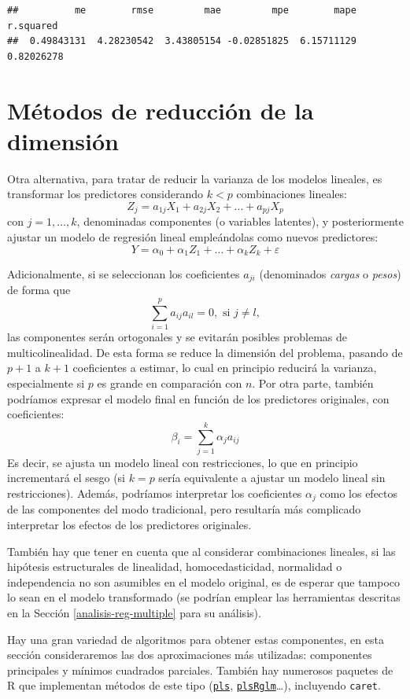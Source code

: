 \documentclass[
]{book}
\theoremstyle{break}
\theoremstyle{definition}
\theoremstyle{definition}
\theoremstyle{definition}
\theoremstyle{remark}
\begin{document}
\begin{verbatim}
##          me        rmse         mae         mpe        mape   r.squared 
##  0.49843131  4.28230542  3.43805154 -0.02851825  6.15711129  0.82026278
\end{verbatim}

\hypertarget{pca-pls}{%
\section{Métodos de reducción de la dimensión}\label{pca-pls}}

Otra alternativa, para tratar de reducir la varianza de los modelos lineales, es transformar los predictores considerando \(k < p\) combinaciones lineales:
\[Z_j = a_{1j}X_{1} + a_{2j}X_{2} + \ldots + a_{pj}X_{p}\]
con \(j = 1, \ldots, k\), denominadas componentes (o variables latentes),
y posteriormente ajustar un modelo de regresión lineal empleándolas como nuevos predictores:
\[Y = \alpha_0 + \alpha_1 Z_1 + \ldots + \alpha_k Z_k + \varepsilon\]

Adicionalmente, si se seleccionan los coeficientes \(a_{ji}\) (denominados \emph{cargas} o \emph{pesos}) de forma que
\[\sum_{i=1}^p a_{ij}a_{il} = 0, \text{ si } j \neq l,\]
las componentes serán ortogonales y se evitarán posibles problemas de multicolinealidad.
De esta forma se reduce la dimensión del problema, pasando de \(p + 1\) a \(k + 1\) coeficientes a estimar, lo cual en principio reducirá la varianza, especialmente si \(p\) es grande en comparación con \(n\).
Por otra parte, también podríamos expresar el modelo final en función de los predictores originales, con coeficientes:
\[\beta_i = \sum_{j=1}^k \alpha_j a_{ij}\]
Es decir, se ajusta un modelo lineal con restricciones, lo que en principio incrementará el sesgo (si \(k = p\) sería equivalente a ajustar un modelo lineal sin restricciones).
Además, podríamos interpretar los coeficientes \(\alpha_j\) como los efectos de las componentes del modo tradicional, pero resultaría más complicado interpretar los efectos de los predictores originales.

También hay que tener en cuenta que al considerar combinaciones lineales, si las hipótesis estructurales de linealidad, homocedasticidad, normalidad o independencia no son asumibles en el modelo original, es de esperar que tampoco lo sean en el modelo transformado (se podrían emplear las herramientas descritas en la Sección \ref{analisis-reg-multiple} para su análisis).

Hay una gran variedad de algoritmos para obtener estas componentes, en esta sección consideraremos las dos aproximaciones más utilizadas: componentes principales y mínimos cuadrados parciales.
También hay numerosos paquetes de R que implementan métodos de este tipo (\href{https://mevik.net/work/software/pls.html}{\texttt{pls}}, \href{https://github.com/fbertran/plsRglm}{\texttt{plsRglm}}\ldots), incluyendo \texttt{caret}.
\end{document}
